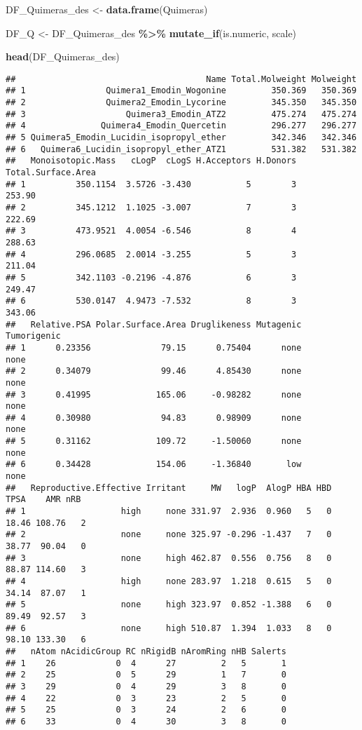 \documentclass[
]{article}
\newenvironment{Shaded}{\begin{snugshade}}{\end{snugshade}}
\newcommand{\FunctionTok}[1]{\textcolor[rgb]{0.13,0.29,0.53}{\textbf{#1}}}
\newcommand{\NormalTok}[1]{#1}
\newcommand{\OtherTok}[1]{\textcolor[rgb]{0.56,0.35,0.01}{#1}}
\newcommand{\SpecialCharTok}[1]{\textcolor[rgb]{0.81,0.36,0.00}{\textbf{#1}}}
\begin{document}
\begin{Shaded}
\begin{Highlighting}[]
\NormalTok{DF\_Quimeras\_des }\OtherTok{\textless{}{-}} \FunctionTok{data.frame}\NormalTok{(Quimeras)}

\NormalTok{DF\_Q }\OtherTok{\textless{}{-}}\NormalTok{ DF\_Quimeras\_des }\SpecialCharTok{\%\textgreater{}\%} 
  \FunctionTok{mutate\_if}\NormalTok{(is.numeric, scale)}

\FunctionTok{head}\NormalTok{(DF\_Quimeras\_des)}
\end{Highlighting}
\end{Shaded}

\begin{verbatim}
##                                      Name Total.Molweight Molweight
## 1                Quimera1_Emodin_Wogonine         350.369   350.369
## 2                Quimera2_Emodin_Lycorine         345.350   345.350
## 3                    Quimera3_Emodin_ATZ2         475.274   475.274
## 4               Quimera4_Emodin_Quercetin         296.277   296.277
## 5 Quimera5_Emodin_Lucidin_isopropyl_ether         342.346   342.346
## 6   Quimera6_Lucidin_isopropyl_ether_ATZ1         531.382   531.382
##   Monoisotopic.Mass   cLogP  cLogS H.Acceptors H.Donors Total.Surface.Area
## 1          350.1154  3.5726 -3.430           5        3             253.90
## 2          345.1212  1.1025 -3.007           7        3             222.69
## 3          473.9521  4.0054 -6.546           8        4             288.63
## 4          296.0685  2.0014 -3.255           5        3             211.04
## 5          342.1103 -0.2196 -4.876           6        3             249.47
## 6          530.0147  4.9473 -7.532           8        3             343.06
##   Relative.PSA Polar.Surface.Area Druglikeness Mutagenic Tumorigenic
## 1      0.23356              79.15      0.75404      none        none
## 2      0.34079              99.46      4.85430      none        none
## 3      0.41995             165.06     -0.98282      none        none
## 4      0.30980              94.83      0.98909      none        none
## 5      0.31162             109.72     -1.50060      none        none
## 6      0.34428             154.06     -1.36840       low        none
##   Reproductive.Effective Irritant     MW   logP  AlogP HBA HBD  TPSA    AMR nRB
## 1                   high     none 331.97  2.936  0.960   5   0 18.46 108.76   2
## 2                   none     none 325.97 -0.296 -1.437   7   0 38.77  90.04   0
## 3                   none     high 462.87  0.556  0.756   8   0 88.87 114.60   3
## 4                   high     none 283.97  1.218  0.615   5   0 34.14  87.07   1
## 5                   none     high 323.97  0.852 -1.388   6   0 89.49  92.57   3
## 6                   none     high 510.87  1.394  1.033   8   0 98.10 133.30   6
##   nAtom nAcidicGroup RC nRigidB nAromRing nHB Salerts
## 1    26            0  4      27         2   5       1
## 2    25            0  5      29         1   7       0
## 3    29            0  4      29         3   8       0
## 4    22            0  3      23         2   5       0
## 5    25            0  3      24         2   6       0
## 6    33            0  4      30         3   8       0
\end{verbatim}
\end{document}
